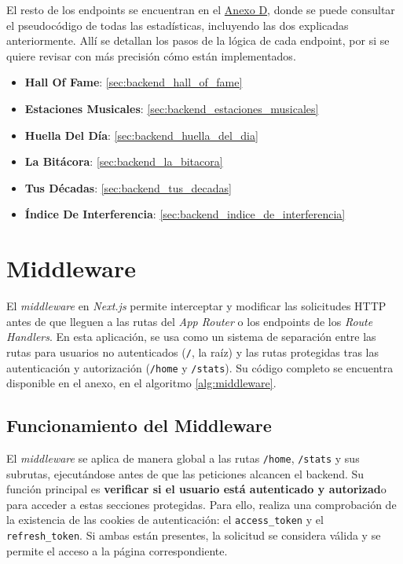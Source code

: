 El resto de los endpoints se encuentran en el \hyperref[ch:anexoD]{Anexo D}, donde se puede consultar el pseudocódigo de todas las estadísticas, incluyendo las dos explicadas anteriormente. Allí se detallan los pasos de la lógica de cada endpoint, por si se quiere revisar con más precisión cómo están implementados.

\begin{itemize}
    \item \textbf{Hall Of Fame}: \ref{sec:backend_hall_of_fame}
    \item \textbf{Estaciones Musicales}: \ref{sec:backend_estaciones_musicales}
    \item \textbf{Huella Del Día}: \ref{sec:backend_huella_del_dia}
    \item \textbf{La Bitácora}: \ref{sec:backend_la_bitacora}
    \item \textbf{Tus Décadas}: \ref{sec:backend_tus_decadas}
    \item \textbf{Índice De Interferencia}: \ref{sec:backend_indice_de_interferencia}
\end{itemize}

\section{Middleware}

El \textit{middleware} en \textit{Next.js} permite interceptar y modificar las solicitudes HTTP antes de que lleguen a las rutas del \textit{App Router} o los endpoints de los \textit{Route Handlers}. En esta aplicación, se usa como un sistema de separación entre las rutas para usuarios no autenticados (\texttt{/}, la raíz) y las rutas protegidas tras las autenticación y autorización (\texttt{/home} y \texttt{/stats}). Su código completo se encuentra disponible en el anexo, en el algoritmo \ref{alg:middleware}.

\subsection{Funcionamiento del Middleware}

El \textit{middleware} se aplica de manera global a las rutas \texttt{/home}, \texttt{/stats} y sus subrutas, ejecutándose antes de que las peticiones alcancen el backend. Su función principal es \textbf{verificar si el usuario está autenticado y autorizad}o para acceder a estas secciones protegidas. Para ello, realiza una comprobación de la existencia de las cookies de autenticación: el \texttt{access\_token} y el \texttt{refresh\_token}. Si ambas están presentes, la solicitud se considera válida y se permite el acceso a la página correspondiente.

